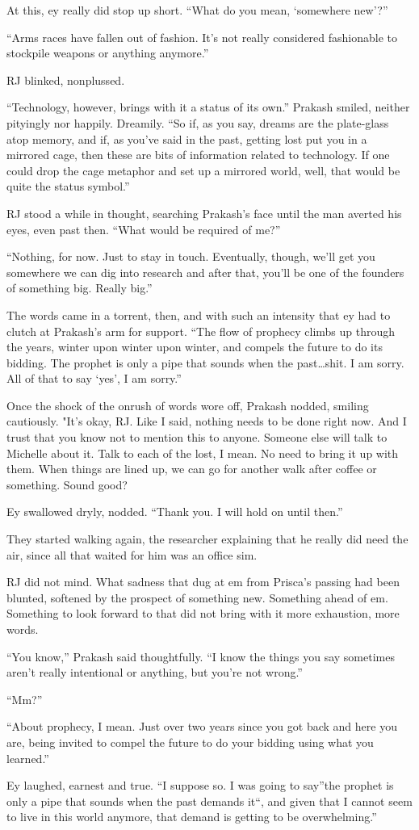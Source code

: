 At this, ey really did stop up short. ``What do you mean, `somewhere new'?''

``Arms races have fallen out of fashion. It's not really considered fashionable to stockpile weapons or anything anymore.''

RJ blinked, nonplussed.

``Technology, however, brings with it a status of its own.'' Prakash smiled, neither pityingly nor happily. Dreamily. ``So if, as you say, dreams are the plate-glass atop memory, and if, as you've said in the past, getting lost put you in a mirrored cage, then these are bits of information related to technology. If one could drop the cage metaphor and set up a mirrored world, well, that would be quite the status symbol.''

RJ stood a while in thought, searching Prakash's face until the man averted his eyes, even past then. ``What would be required of me?''

``Nothing, for now. Just to stay in touch. Eventually, though, we'll get you somewhere we can dig into research and after that, you'll be one of the founders of something big. Really big.''

The words came in a torrent, then, and with such an intensity that ey had to clutch at Prakash's arm for support. ``The flow of prophecy climbs up through the years, winter upon winter upon winter, and compels the future to do its bidding. The prophet is only a pipe that sounds when the past\ldots shit. I am sorry. All of that to say `yes', I am sorry.''

Once the shock of the onrush of words wore off, Prakash nodded, smiling cautiously. "It's okay, RJ. Like I said, nothing needs to be done right now. And I trust that you know not to mention this to anyone. Someone else will talk to Michelle about it. Talk to each of the lost, I mean. No need to bring it up with them. When things are lined up, we can go for another walk after coffee or something. Sound good?

Ey swallowed dryly, nodded. ``Thank you. I will hold on until then.''

They started walking again, the researcher explaining that he really did need the air, since all that waited for him was an office sim.

RJ did not mind. What sadness that dug at em from Prisca's passing had been blunted, softened by the prospect of something new. Something ahead of em. Something to look forward to that did not bring with it more exhaustion, more words.

``You know,'' Prakash said thoughtfully. ``I know the things you say sometimes aren't really intentional or anything, but you're not wrong.''

``Mm?''

``About prophecy, I mean. Just over two years since you got back and here you are, being invited to compel the future to do your bidding using what you learned.''

Ey laughed, earnest and true. ``I suppose so. I was going to say''the prophet is only a pipe that sounds when the past demands it``, and given that I cannot seem to live in this world anymore, that demand is getting to be overwhelming.''
